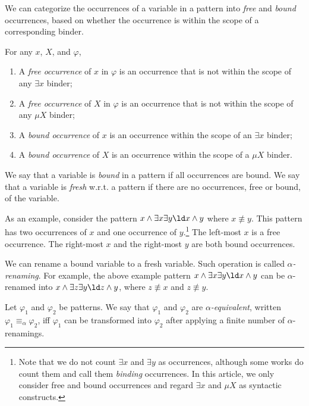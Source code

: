\documentclass{article}
\begin{document}
We can categorize the occurrences of a variable in a pattern
into \emph{free} and \emph{bound} occurrences,
based on whether the occurrence is within the scope
of a corresponding binder.

\begin{definition}
For any $x$, $X$, and $\varphi$,
\begin{enumerate}
\item A \emph{free occurrence} of $x$ in $\varphi$
      is an occurrence that is not within the scope of any $\exists x$ binder;
\item A \emph{free occurrence} of $X$ in $\varphi$
      is an occurrence that is not within the scope of any $\mu X$ binder;
\item A \emph{bound occurrence} of $x$ is an occurrence
      within the scope of an $\exists x$ binder;
\item A \emph{bound occurrence} of $X$ is an occurrence
      within the scope of a $\mu X$ binder.
\end{enumerate}
We say that a variable is \emph{bound} in a pattern if
all occurrences are bound.
We say that a variable is \emph{fresh} w.r.t. a pattern if
there are no occurrences, free or bound, of the variable.
\end{definition}

As an example, consider the pattern
$x \land \exists x \exists y \ld x \land y$
where $x \not\equiv y$.
This pattern
has two occurrences of $x$ and one occurrence of $y$.\footnote{Note that we do not count $\exists x$ and $\exists y$ as occurrences, although some works do count them and call them \emph{binding} occurrences. In this article, we only consider free and bound occurrences and regard
$\exists x$ and $\mu X$ as syntactic constructs.}
The left-most $x$ is a free occurrence.
The right-most $x$ and the right-most $y$ are both bound occurrences.

We can rename a bound variable to a fresh variable.
Such operation is called \emph{$\alpha$-renaming}.
For example, the above example pattern
$x \land \exists x \exists y \ld x \land y$
can be $\alpha$-renamed into
$x \land \exists z \exists y \ld z \land y$,
where $z \not\equiv x$ and $z \not\equiv y$.

\begin{definition}
Let $\varphi_1$ and $\varphi_2$ be patterns.
We say that $\varphi_1$ and $\varphi_2$
are \emph{$\alpha$-equivalent}, written $\varphi_1 \equiv_\alpha \varphi_2$,
iff $\varphi_1$ can be transformed into $\varphi_2$ after applying
a finite number of $\alpha$-renamings.
\end{definition}
\end{document}
